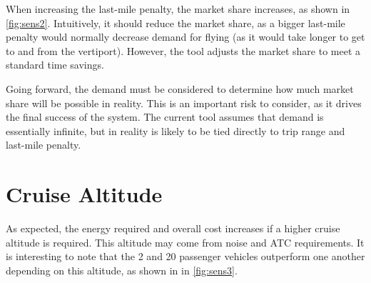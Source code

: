 When increasing the last-mile penalty, the market share increases, as shown in \autoref{fig:sens2}. Intuitively, it should reduce the market share, as a bigger last-mile penalty would normally decrease demand for flying (as it would take longer to get to and from the vertiport). However, the tool adjusts the market share to meet a standard time savings.

Going forward, the demand must be considered to determine how much market share will be possible in reality. This is an important risk to consider, as it drives the final success of the system. The current tool assumes that demand is essentially infinite, but in reality is likely to be tied directly to trip range and last-mile penalty.


\section{Cruise Altitude}
As expected, the energy required and overall cost increases if a higher cruise altitude is required. This altitude may come from noise and ATC requirements. It is interesting to note that the 2 and 20 passenger vehicles outperform one another depending on this altitude, as shown in in \autoref{fig:sens3}.


